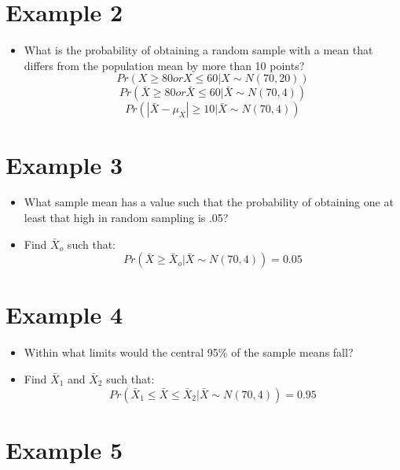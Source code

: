 \documentclass[11pt]{article}
\begin{document}
\section{Example 2}\label{example-2}

\begin{itemize}
\itemsep1pt\parskip0pt
\item
  What is the probability of obtaining a random sample with a mean that
  differs from the population mean by more than 10 points?
  \[ Pr (X \geq 80 or X \leq 60 | X \sim N(70, 20)) \]
  \[ Pr (\bar{X} \geq 80 or \bar{X} \leq 60 | \bar{X} \sim N(70, 4)) \]
  \[ Pr (|\bar{X} - \mu_{X}| \geq 10 | \bar{X} \sim N(70, 4)) \]
\end{itemize}

\section{Example 3}\label{example-3}

\begin{itemize}
\itemsep1pt\parskip0pt
\item
  What sample mean has a value such that the probability of obtaining
  one at least that high in random sampling is .05?
\item
  Find \(\bar{X}_{o}\) such that:
  \[ Pr (\bar{X} \geq \bar{X}_{o} | \bar{X} \sim N(70, 4)) = 0.05 \]
\end{itemize}

\section{Example 4}\label{example-4}

\begin{itemize}
\itemsep1pt\parskip0pt
\item
  Within what limits would the central 95\% of the sample means fall?
\item
  Find \(\bar{X}_{1}\) and \(\bar{X}_{2}\) such that:
  \[ Pr (\bar{X}_{1} \leq \bar{X} \leq \bar{X}_{2} | \bar{X} \sim N(70, 4)) = 0.95 \]
\end{itemize}

\section{Example 5}
\end{document}
